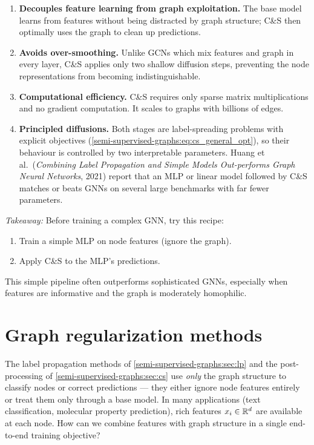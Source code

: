 \begin{notechapter}
\begin{enumerate}
    \item \textbf{Decouples feature learning from graph exploitation.}
          The base model learns from features without being distracted by graph
          structure; C\&S then optimally uses the graph to clean up predictions.
    \item \textbf{Avoids over-smoothing.} Unlike GCNs which mix features and
          graph in every layer, C\&S applies only two shallow diffusion steps,
          preventing the node representations from becoming indistinguishable.
    \item \textbf{Computational efficiency.} C\&S requires only sparse matrix
          multiplications and no gradient computation. It scales to graphs with
          billions of edges.
    \item \textbf{Principled diffusions.} Both stages are label-spreading problems with explicit objectives (\cref{semi-supervised-graphs:eq:cs_general_opt}), so their behaviour is controlled by two interpretable parameters. Huang et al.\ (\emph{Combining Label Propagation and Simple Models Out-performs Graph Neural Networks}, 2021) report that an MLP or linear model followed by C\&S matches or beats GNNs on several large benchmarks with far fewer parameters.
\end{enumerate}

\begin{intuition}
\emph{Takeaway:} Before training a complex GNN, try this recipe:
\begin{enumerate}
    \item Train a simple MLP on node features (ignore the graph).
    \item Apply C\&S to the MLP's predictions.
\end{enumerate}
This simple pipeline often outperforms sophisticated GNNs, especially when
features are informative and the graph is moderately homophilic.
\end{intuition}


\section{Graph regularization methods}
\label{semi-supervised-graphs:sec:reg}

The label propagation methods of \cref{semi-supervised-graphs:sec:lp} and the post-processing
of \cref{semi-supervised-graphs:sec:cs} use \emph{only} the graph structure to classify nodes
or correct predictions --- they either ignore node features entirely or treat
them only through a base model. In many applications (text classification,
molecular property prediction), rich features $x_i \in \mathbb{R}^d$ are available at
each node. How can we combine features with graph structure in a single
end-to-end training objective?


\end{notechapter}
